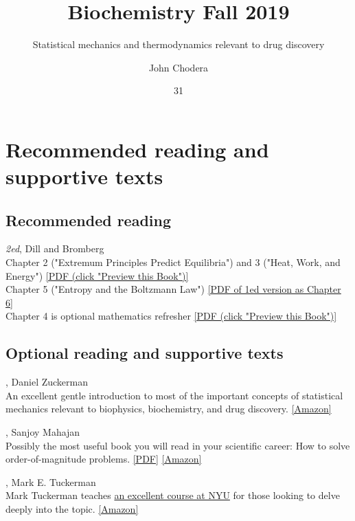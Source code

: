 \documentclass[english,course]{lecture}
\title{Biochemistry Fall 2019}
\subtitle{Statistical mechanics and thermodynamics relevant to drug discovery}
\author{John Chodera}
\date{31}{08}{2018}
\begin{document}
\vfill
\eject


\section{Recommended reading and supportive texts}

\subsection*{Recommended reading}

 \emph{2ed}, Dill and Bromberg\\
Chapter 2 ("Extremum Principles Predict Equilibria") and 3 ("Heat, Work, and Energy") \href{https://tinyurl.com/dill-bromberg-preview}{[PDF (click "Preview this Book")]}\\
Chapter 5 ("Entropy and the Boltzmann Law") \href{https://tinyurl.com/dill-bromberg-boltzmann}{[PDF of 1ed version as Chapter 6]}\\
Chapter 4 is optional mathematics refresher \href{https://tinyurl.com/dill-bromberg-preview}{[PDF (click "Preview this Book")]}

\subsection*{Optional reading and supportive texts}

, Daniel Zuckerman \\
An excellent gentle introduction to most of the important concepts of statistical mechanics relevant to biophysics, biochemistry, and drug discovery. 
\href{https://www.amazon.com/dp/B005H6YEBI}{[Amazon]} 

, Sanjoy Mahajan \\
Possibly the most useful book you will read in your scientific career: How to solve order-of-magnitude problems.
\href{https://tinyurl.com/street-fighting-mathematics}{[PDF]}
\href{https://www.amazon.com/exec/obidos/ASIN/026251429X}{[Amazon]}

, Mark E. Tuckerman \\
Mark Tuckerman teaches \href{http://www.nyu.edu/classes/tuckerman/stat.mech/}{an excellent course at NYU} for those looking to delve deeply into the topic.
\href{https://www.amazon.com/Statistical-Mechanics-Molecular-Simulation-Graduate/dp/0198525265}{[Amazon]}
\end{document}
